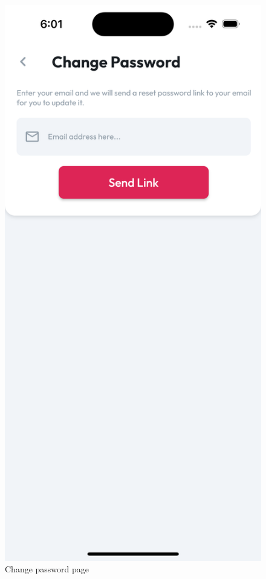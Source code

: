 \documentclass{Configuration_Files/PoliMi3i_thesis}
\begin{document}
\begin{figure}[!h]
  \includegraphics[scale=0.1]{Images/Screenshots/Mobile/ChangePasswordLight.png}
  \caption{Change password page}
\end{figure}

\clearpage
\end{document}
